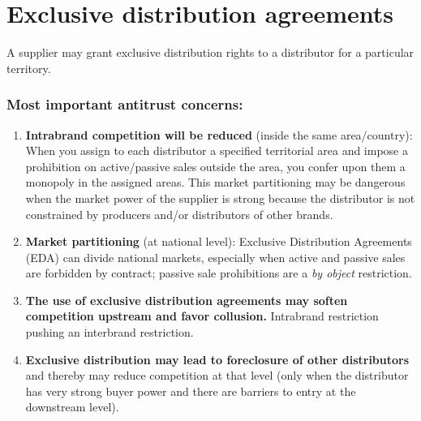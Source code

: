 \section{Exclusive distribution agreements}

    A supplier may grant exclusive distribution rights to a distributor for a particular territory.

    
    \subsubsection{Most important antitrust concerns:}
    
    \begin{enumerate}[label=\alph*.]
        \item \textbf{Intrabrand competition will be reduced} (inside the same area/country): When you assign to each distributor a specified territorial area and impose a prohibition on active/passive sales outside the area, you confer upon them a monopoly in the assigned areas. This market partitioning may be dangerous when the market power of the supplier is strong because the distributor is not constrained by producers and/or distributors of other brands.
    
        \item \textbf{Market partitioning} (at national level): Exclusive Distribution Agreements (EDA) can divide national markets, especially when active and passive sales are forbidden by contract; passive sale prohibitions are a \emph{by object} restriction.
    
        \item \textbf{The use of exclusive distribution agreements may soften competition upstream and favor collusion.} Intrabrand restriction pushing an interbrand restriction.
    
        \item \textbf{Exclusive distribution may lead to foreclosure of other distributors }and thereby may reduce competition at that level (only when the distributor has very strong buyer power and there are barriers to entry at the downstream level).
    \end{enumerate}


